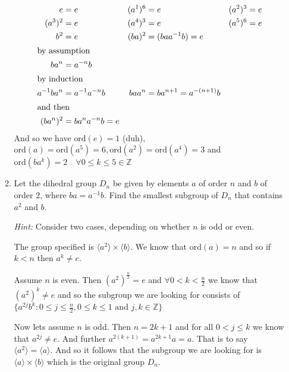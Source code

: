 \documentclass[letterpaper]{article}
\begin{document}
\begin{enumerate}
\begin{enumerate}
    \begin{align*}
      e&=e&
      (a^1)^6&=e&
      (a^2)^3&=e\\
      (a^3)^2&=e&
      (a^4)^3&=e&
      (a^5)^6&=e\\
      b^2&=e&
      (ba)^2&=(baa^{-1}b)=e\\
      \intertext{by assumption}ba^n&=a^{-n}b\\
      \intertext{by induction}a^{-1}ba^n&=a^{-1}a^{-n}b&
      baa^n&=ba^{n+1}=a^{-(n+1)}b\\
      \intertext{and then}(ba^n)^2&=ba^na^{-n}b=e
    \end{align*}
    And so we have $\text{ord}(e)=1$ (duh), $\text{ord}(a)=\text{ord}(a^5)=6, \text{ord}(a^2)=\text{ord}(a^4)=3$ and $\text{ord}(ba^k)=2\quad\forall 0\le k\le 5\in\mathbb{Z}$
  \setcounter{enumii}{19}
  \item
    Let the dihedral group $D_n$ be given by elements $a$ of order $n$ and $b$ of order 2, where $ba=a^{-1}b$. Find the smallest subgroup of $D_n$ that contains $a^2$ and $b$.

    {\em Hint: }Consider two cases, depending on whether $n$ is odd or even.

    The group specified is $\langle a^2\rangle\times\langle b\rangle$. We know that $\text{ord}(a)=n$ and so if $k<n$ then $a^k\ne e$.

    Assume $n$ is even. Then $(a^2)^{\frac{n}{2}}=e$ and $\forall0<k<\frac{n}{2}$ we know that $(a^2)^{k}\ne e$ and so the subgroup we are looking for consists of $\{a^{2j}b^k:0\le j\le\frac{n}{2},0\le k\le1\text{ and }j,k\in\mathbb{Z}\}$

    Now lets assume $n$ is odd. Then $n=2k+1$ and for all $0<j\le k$ we know that $a^{2j}\ne e$. And further $a^{2(k+1)}=a^{2k+1}a=a$. That is to say $\langle a^2\rangle=\langle a\rangle$. And so it follows that the subgroup we are looking for is $\langle a\rangle\times\langle b\rangle$ which is the original group $D_n$.
  \end{enumerate}
\end{enumerate}
\end{document}

